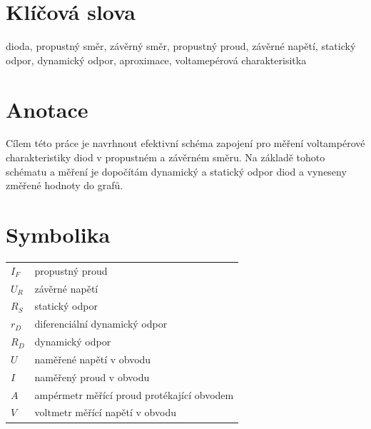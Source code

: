 \documentclass[12pt]{article} %
\begin{document}
\section*{Klíčová slova}
dioda, propustný směr, závěrný směr, propustný proud, závěrné napětí, statický odpor, dynamický odpor, aproximace, voltamepérová charakterisitka

\section*{Anotace}
Cílem této práce je navrhnout efektivní schéma zapojení pro měření voltampérové charakteristiky diod v propustném a závěrném směru. Na základě tohoto schématu a měření je dopočítám dynamický a statický odpor diod a vyneseny změřené hodnoty do grafů.

\section*{Symbolika}
\begin{table}[H]
\begin{tabular*}{0.7\textwidth}{@{\extracolsep{\fill} } ll}
$I_F$ & propustný proud \\ 
$U_R$ & závěrné napětí \\ 
$R_S$ & statický odpor \\
$r_D$ & diferenciální dynamický odpor \\
$R_D$ & dynamický odpor \\
$U$ & naměřené napětí v obvodu \\
$I$ & naměřený proud v obvodu \\
$A$ & ampérmetr měřící proud protékající obvodem \\
$V$ & voltmetr měřící napětí v obvodu \\
\end{tabular*} 
\end{table}
\end{document}
